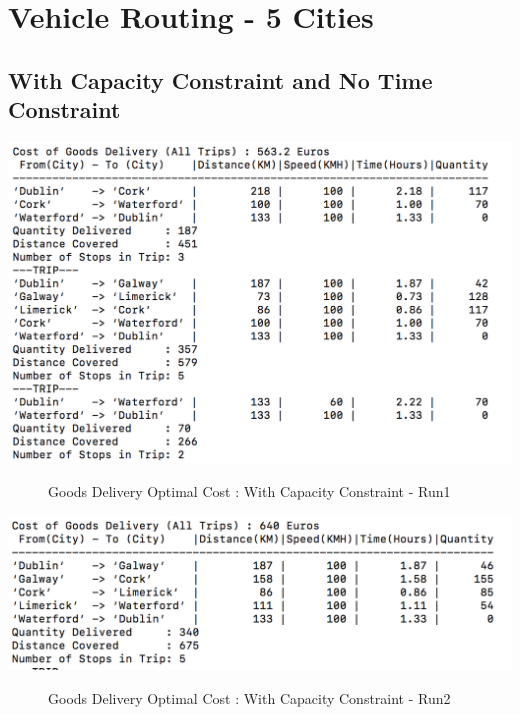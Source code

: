 \documentclass[a4paper&11pt]{article}
\begin{document}
\section*{ Vehicle Routing - 5 Cities}
\subsection*{With Capacity Constraint and No Time Constraint}


\begin{center}
\includegraphics[scale=0.8]{fig1.png}
\begin{figure}[H]
\caption{Goods Delivery Optimal Cost :  With Capacity Constraint - Run1}
\end{figure}
\end{center}


\begin{center}
\includegraphics[scale=0.8]{fig2.png}
\begin{figure}[H]
\caption{Goods Delivery Optimal Cost :  With Capacity Constraint - Run2}
\end{figure}
\end{center}
\end{document}
